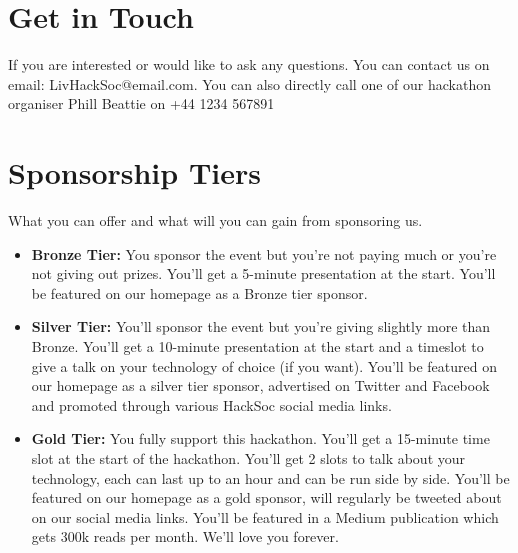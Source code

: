 \documentclass[10pt, a4paper, onecolumn]{report}
\begin{document}
    
    \section *{Get in Touch}
    If you are interested or would like to ask any questions. You can contact us on email: \textcolor{MyLinkBlue}{LivHackSoc@email.com}. You can also directly call one of our hackathon organiser Phill Beattie on \textcolor{MyLinkBlue}{+44 1234 567891}

    \pagebreak

    \section *{Sponsorship Tiers}
    What you can offer and what will you can gain from sponsoring us. \\

    \begin{itemize} 
        \item \textbf{Bronze Tier:} You sponsor the event but you're not paying much or you're not giving out prizes. You'll get a 5-minute presentation at the start. You'll be featured on our homepage as a Bronze tier sponsor.

        \item \textbf{Silver Tier:} You'll sponsor the event but you're giving slightly more than Bronze. You'll get a 10-minute presentation at the start and a timeslot to give a talk on your technology of choice (if you want). You'll be featured on our homepage as a silver tier sponsor, advertised on Twitter and Facebook and promoted through various HackSoc social media links.

        \item \textbf{Gold Tier:} You fully support this hackathon.  You'll get a 15-minute time slot at the start of the hackathon. You'll get 2 slots to talk about your technology, each can last up to an hour and can be run side by side. You'll be featured on our homepage as a gold sponsor, will regularly be tweeted about on our social media links. You'll be featured in a Medium publication which gets 300k reads per month. We'll love you forever.
    \end{itemize}
    
    
\end{document}
